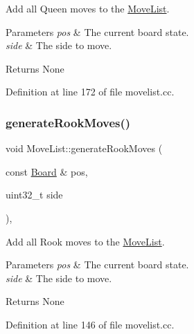 Add all Queen moves to the \mbox{\hyperlink{classMoveList}{Move\+List}}. 


\begin{DoxyParams}{Parameters}
{\em pos} & The current board state. \\
\hline
{\em side} & The side to move. \\
\hline
\end{DoxyParams}
\begin{DoxyReturn}{Returns}
None 
\end{DoxyReturn}


Definition at line 172 of file movelist.\+cc.

\mbox{\label{classMoveList_a2f10e1e4e2b5bec034656a3038b42d95}} 
\subsubsection{\texorpdfstring{generate\+Rook\+Moves()}{generateRookMoves()}}
{\footnotesize\ttfamily void Move\+List\+::generate\+Rook\+Moves (\begin{DoxyParamCaption}\item[{const \mbox{\hyperlink{classBoard}{Board}} \&}]{pos,  }\item[{uint32\+\_\+t}]{side }\end{DoxyParamCaption})\hspace{0.3cm}{\ttfamily [private]}, {\ttfamily [noexcept]}}



Add all Rook moves to the \mbox{\hyperlink{classMoveList}{Move\+List}}. 


\begin{DoxyParams}{Parameters}
{\em pos} & The current board state. \\
\hline
{\em side} & The side to move. \\
\hline
\end{DoxyParams}
\begin{DoxyReturn}{Returns}
None 
\end{DoxyReturn}


Definition at line 146 of file movelist.\+cc.

\mbox{\label{classMoveList_a631546d45818cb40c204dde6fa368ea8}} 
